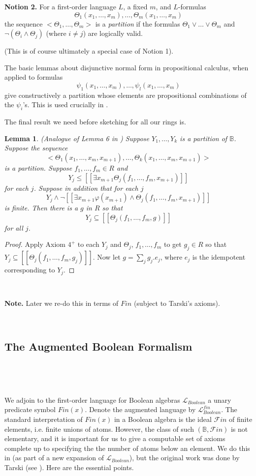 \documentclass[12pt]{amsart}
\def\B{\mathbb{B}}
\def\cL{\mathcal{L}}
\def\cL{\mathcal{L}}
\newtheorem{lemma}{Lemma}[section]
\numberwithin{equation}{section}
\begin{document}
{\bf Notion 2.} For a first-order language $L$, a fixed $m$, and $L$-formulas 
$$\Theta_1(x_1,\dots,x_m),\dots,\Theta_m(x_1,\dots,x_m)$$
the sequence $<\Theta_1,\dots,\Theta_m>$ is a {\it partition} if the formulas 
$\Theta_1 \vee \dots \vee \Theta_m$ and $\neg(\Theta_i \wedge \Theta_j)$ (where $i\neq j$) are logically valid.

(This is of course ultimately a special case of Notion 1).

The basic lemmas about disjunctive normal form in propositional calculus, when applied to formulas 
$$\psi_1(x_1,\dots,x_m),\dots,\psi_l(x_1,\dots,x_m)$$
give constructively a partition whose elements are propositional combinations of the $\psi_i$'s. This is used crucially in \cite{FV}. 

The final result we need before sketching \cite{FV} for all our rings is.

\begin{lemma}\label{lem6+} (Analogue of Lemma 6 in \cite{elem-prod}) Suppose $Y_1,\dots,Y_k$ is a partition of $\B$. 
Suppose the sequence
$$<\Theta_1(x_1,\dots,x_m,x_{m+1}),\dots,\Theta_k(x_1,\dots,x_m,x_{m+1})>$$ 
is a partition. Suppose $f_1,\dots,f_m\in R$ and 
$$Y_j\leq [[\exists x_{m+1} \Theta_j(f_1,\dots,f_m,x_{m+1})]]$$
for each $j$. Suppose in addition that for each $j$
$$Y_j \wedge \neg [[\exists x_{m+1} \varphi(x_{m+1}) \wedge \Theta_j(f_1,\dots,f_m,x_{m+1})]]$$
is finite. Then there is a $g$ in $R$ so that
$$Y_j\subseteq [[\Theta_j(f_1,\dots,f_m,g)]]$$
for all $j$.\end{lemma}
\begin{proof} Apply Axiom $4^+$ to each $Y_j$ and $\Theta_j$, $f_1,\dots,f_m$ to get $g_j\in R$ so that 
$Y_j\subseteq [[\Theta_j(f_1,\dots,f_m,g_j)]]$. Now let $g=\sum_j g_j.e_j$, where $e_j$ is the idempotent corresponding to 
$Y_j$.
\end{proof}

\

{\bf Note.} Later we re-do this in terms of $Fin$ (subject to Tarski's axioms).

\

\subsection{The Augmented Boolean Formalism}\label{sec-bool}

\

\

We adjoin to the first-order language for Boolean algebras $\cL_{Boolean}$ a unary predicate symbol $Fin(x)$. Denote the augmented language by $\cL_{Boolean}^{fin}$. The standard interpretation of $Fin(x)$ in a Boolean algebra is the ideal $\mathcal{F}in$ 
of finite elements, i.e. finite unions of atoms. 
However, the class of such $(\B,\mathcal{F}in)$ is not elementary, and it is important for us to give a computable set of axioms complete up to specifying the the number of atoms below an element. We do this in \cite{DM-bool} (as part of a new expansion of $\cL_{Boolean}$), but the original work was done by Tarski (see \cite{FV}). Here are the essential points. 
\end{document}
